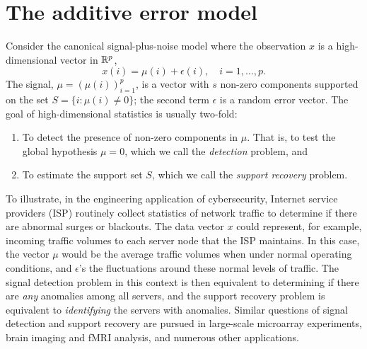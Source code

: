 

\section{The additive error model}

Consider the canonical signal-plus-noise model where the observation $x$ is a high-dimensional vector in $\mathbb R^p$,
\begin{equation} \label{eq:model-additive}
    x(i) = \mu(i) + \epsilon(i), \quad i=1,\ldots,p.
\end{equation}
The signal, $\mu = (\mu(i))_{i=1}^p$, is a vector with $s$ non-zero components supported on the set $S=\{i:\mu(i)\neq 0\}$; the second term $\epsilon$ is a random error vector. 
The goal of high-dimensional statistics is usually two-fold: 
\begin{enumerate}
    \item To detect the presence of non-zero components in $\mu$. That is, to test the global hypothesis $\mu = 0$, which we call the \emph{detection} problem, and
    \item To estimate the support set $S$, which we call the \emph{support recovery} problem.
\end{enumerate}
To illustrate, in the engineering application of cybersecurity, Internet service providers (ISP) routinely collect statistics of network traffic to determine if there are abnormal surges or blackouts.
The data vector $x$ could represent, for example, incoming traffic volumes to each server node that the ISP maintains.
In this case, the vector $\mu$ would be the average traffic volumes when under normal operating conditions, and $\epsilon$'s the fluctuations around these normal levels of traffic.
The signal detection problem in this context is then equivalent to determining if there are \emph{any} anomalies among all servers, and the support recovery problem is equivalent to \emph{identifying} the servers with anomalies.
Similar questions of signal detection and support recovery are pursued in large-scale microarray experiments, %
brain imaging and fMRI analysis, %
and numerous other applications.

